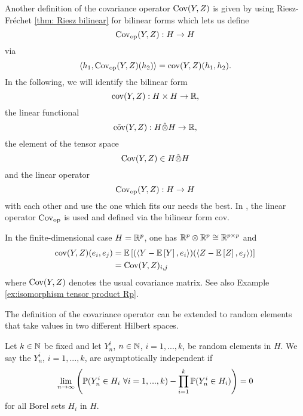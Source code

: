 \begin{remark}
    Another definition of the covariance operator $\mathrm{Cov}(Y, Z)$ is given by using Riesz-Fréchet \ref{thm: Riesz bilinear} for bilinear forms which lets us define
    \[ \mathrm{Cov}_{\mathrm{op}}(Y, Z): H \to H \]
    via
    \[ \langle h_1, \mathrm{Cov}_{\mathrm{op}}(Y, Z)(h_2) \rangle = \mathrm{cov}(Y, Z)(h_1, h_2). \]
    In the following, we will identify the bilinear form 
    \[ \mathrm{cov}(Y, Z): H \times H \to \mathbb{R}, \]
    the linear functional
    \[ \Tilde{\mathrm{cov}}(Y, Z): H \hat{\otimes} H \to \mathbb{R}, \]
    the element of the tensor space
    \[ \mathrm{Cov}(Y, Z) \in H \hat{\otimes} H \]
    and the linear operator
    \[ \mathrm{Cov}_{\mathrm{op}}(Y, Z): H \to H \]
    with each other and use the one which fits our needs the best. In \cite{[0]BUCCHIA2017344}, the linear operator $\mathrm{Cov}_{\mathrm{op}}$ is used and defined via the bilinear form $\mathrm{cov}$.
\end{remark}

\begin{remark} \label{remark: covariance matrix and operator relation finite-dimensional}
    \begin{aufzii}
        \item In the finite-dimensional case $H = \mathbb{R}^p$, one has $\mathbb{R}^p \otimes \mathbb{R}^p \cong \mathbb{R}^{p \times p}$ and
        \begin{align*}
            \mathrm{cov}(Y, Z)(e_i, e_j) 
            & = \mathbb{E}\left[(\langle Y - \mathbb{E}\left[Y\right], e_i \rangle)(\langle Z - \mathbb{E}\left[Z\right], e_j \rangle)\right] \\
            & = \mathrm{Cov}(Y, Z)_{i, j}
        \end{align*}
        where $\mathrm{Cov}(Y, Z)$ denotes the usual covariance matrix. See also Example \ref{ex:isomorphism tensor product Rp}.
        \item The definition of the covariance operator can be extended to random elements that take values in two different Hilbert spaces.
    \end{aufzii}
\end{remark}

\begin{defn} \label{defn: asymptotic independence}
    Let $k \in \mathbb{N}$ be fixed and let $Y^i_n$, $n \in \mathbb{N}$, $i = 1, ..., k$, be random elements in $H$. We say the $Y^i_n$, $i=1, ..., k$, are asymptotically independent if
    \[ \lim\limits_{n \to \infty} \left( \mathbb{P}(Y^i_n \in H_i \ \forall i = 1, ..., k) - \prod\limits_{i=1}^k \mathbb{P}(Y^i_n \in H_i)  \right) = 0 \]
    for all Borel sets $H_i$ in $H$.
\end{defn}

